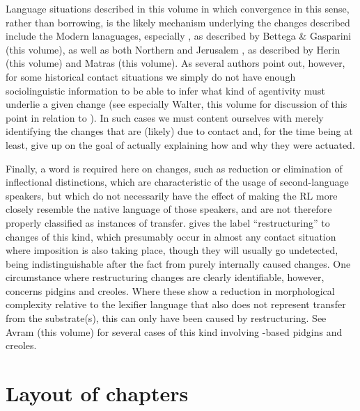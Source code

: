 \documentclass[output=paper]{langsci/langscibook}
\begin{document}
Language situations described in this volume in which {convergence} in this sense, rather than borrowing, is the likely mechanism underlying the changes described include the Modern  lanaguages, especially , as described by Bettega \& Gasparini (this volume), as well as both Northern and Jerusalem , as described by Herin (this volume) and Matras (this volume). As several authors point out, however, for some historical contact situations we simply do not have enough sociolinguistic information to be able to infer what kind of agentivity must underlie a given change (see especially Walter, this volume for discussion of this point in relation to  ). In such cases we must content ourselves with merely identifying the changes that are (likely) due to contact and, for the time being at least, give up on the goal of actually explaining how and why they were {actuated}.

Finally, a word is required here on changes, such as reduction or elimination of {inflectional} distinctions, which are characteristic of the usage of second-language speakers, but which do not necessarily have the effect of making the {RL} more closely resemble the native language of those speakers, and are not therefore properly classified as instances of {transfer}. \citet{Lucas2015} gives the label ``restructuring'' to changes of this kind, which presumably occur in almost any contact situation where {imposition} is also taking place, though they will usually go undetected, being indistinguishable after the fact from purely internally caused changes. One circumstance where restructuring changes are clearly identifiable, however, concerns pidgins and creoles. Where these show a reduction in morphological complexity {relative} to the {lexifier} language that also does not represent {transfer} from the {substrate}(s), this can only have been caused by restructuring. See Avram (this volume) for several cases of this kind involving -based pidgins and creoles.

\section{Layout of chapters}\label{introstructure}
\end{document}
